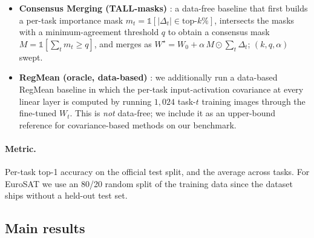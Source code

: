 \documentclass{article} %
\newcommand{\ws}{W^\star}
\begin{document}
\begin{itemize}[leftmargin=1.5em]
\item \textbf{Consensus Merging (TALL-masks)} \citep{wang2024localizing}: a data-free baseline that first builds a per-task importance mask $m_t = \mathbb{1}[|\Delta_t|\in \text{top-}k\%]$, intersects the masks with a minimum-agreement threshold $q$ to obtain a consensus mask $M = \mathbb{1}[\sum_t m_t \geq q]$, and merges as $\ws = W_0 + \alpha\, M \odot \sum_t \Delta_t$; $(k,q,\alpha)$ swept.
\item \textbf{RegMean (oracle, data-based)} \citep{jin2023dataless}: we additionally run a data-based RegMean baseline in which the per-task input-activation covariance at every linear layer is computed by running $1{,}024$ task-$t$ training images through the fine-tuned $W_t$. This is \emph{not} data-free; we include it as an upper-bound reference for covariance-based methods on our benchmark.
\end{itemize}

\paragraph{Metric.} Per-task top-1 accuracy on the official test split, and the average across tasks. For EuroSAT we use an 80/20 random split of the training data since the dataset ships without a held-out test set.

\subsection{Main results}
\end{document}
